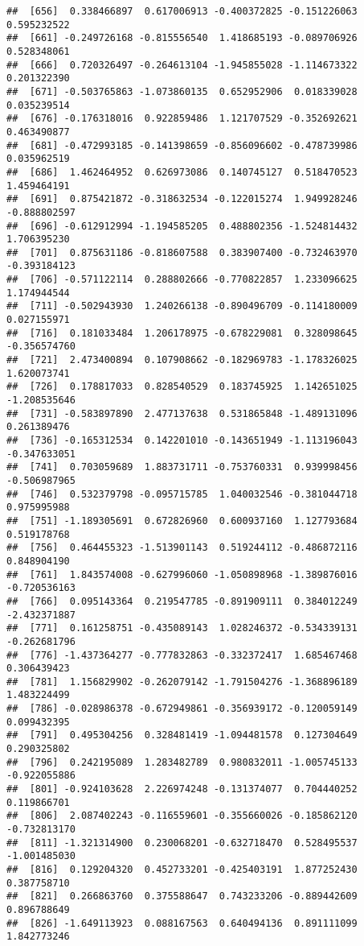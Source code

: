 \documentclass[
]{article}
\begin{document}
\begin{verbatim}
##  [656]  0.338466897  0.617006913 -0.400372825 -0.151226063  0.595232522
##  [661] -0.249726168 -0.815556540  1.418685193 -0.089706926  0.528348061
##  [666]  0.720326497 -0.264613104 -1.945855028 -1.114673322  0.201322390
##  [671] -0.503765863 -1.073860135  0.652952906  0.018339028  0.035239514
##  [676] -0.176318016  0.922859486  1.121707529 -0.352692621  0.463490877
##  [681] -0.472993185 -0.141398659 -0.856096602 -0.478739986  0.035962519
##  [686]  1.462464952  0.626973086  0.140745127  0.518470523  1.459464191
##  [691]  0.875421872 -0.318632534 -0.122015274  1.949928246 -0.888802597
##  [696] -0.612912994 -1.194585205  0.488802356 -1.524814432  1.706395230
##  [701]  0.875631186 -0.818607588  0.383907400 -0.732463970 -0.393184123
##  [706] -0.571122114  0.288802666 -0.770822857  1.233096625  1.174944544
##  [711] -0.502943930  1.240266138 -0.890496709 -0.114180009  0.027155971
##  [716]  0.181033484  1.206178975 -0.678229081  0.328098645 -0.356574760
##  [721]  2.473400894  0.107908662 -0.182969783 -1.178326025  1.620073741
##  [726]  0.178817033  0.828540529  0.183745925  1.142651025 -1.208535646
##  [731] -0.583897890  2.477137638  0.531865848 -1.489131096  0.261389476
##  [736] -0.165312534  0.142201010 -0.143651949 -1.113196043 -0.347633051
##  [741]  0.703059689  1.883731711 -0.753760331  0.939998456 -0.506987965
##  [746]  0.532379798 -0.095715785  1.040032546 -0.381044718  0.975995988
##  [751] -1.189305691  0.672826960  0.600937160  1.127793684  0.519178768
##  [756]  0.464455323 -1.513901143  0.519244112 -0.486872116  0.848904190
##  [761]  1.843574008 -0.627996060 -1.050898968 -1.389876016 -0.720536163
##  [766]  0.095143364  0.219547785 -0.891909111  0.384012249 -2.432371887
##  [771]  0.161258751 -0.435089143  1.028246372 -0.534339131 -0.262681796
##  [776] -1.437364277 -0.777832863 -0.332372417  1.685467468  0.306439423
##  [781]  1.156829902 -0.262079142 -1.791504276 -1.368896189  1.483224499
##  [786] -0.028986378 -0.672949861 -0.356939172 -0.120059149  0.099432395
##  [791]  0.495304256  0.328481419 -1.094481578  0.127304649  0.290325802
##  [796]  0.242195089  1.283482789  0.980832011 -1.005745133 -0.922055886
##  [801] -0.924103628  2.226974248 -0.131374077  0.704440252  0.119866701
##  [806]  2.087402243 -0.116559601 -0.355660026 -0.185862120 -0.732813170
##  [811] -1.321314900  0.230068201 -0.632718470  0.528495537 -1.001485030
##  [816]  0.129204320  0.452733201 -0.425403191  1.877252430  0.387758710
##  [821]  0.266863760  0.375588647  0.743233206 -0.889442609  0.896788649
##  [826] -1.649113923  0.088167563  0.640494136  0.891111099  1.842773246

\end{verbatim}
\end{document}
